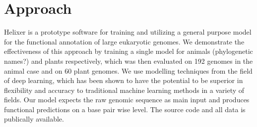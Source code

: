 \documentclass{bioinfo}
\begin{document}
\section{Approach}
Helixer is a prototype software for training and utilizing a general purpose model for the functional annotation of large eukaryotic genomes. We demonstrate the effectiveness of this approach by training a single model for animals (phylogenetic names?) and plants respectively, which was then evaluated on 192 genomes in the animal case and on 60 plant genomes. We use modelling techniques from the field of deep learning, which has been shown to have the potential to be superior in flexibility and accuracy to traditional machine learning methods in a variety of fields. Our model expects the raw genomic sequence as main input and produces functional predictions on a base pair wise level. The source code and all data is publically available.
\end{document}
